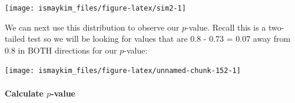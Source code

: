 \documentclass[]{tufte-book}
\newenvironment{Shaded}{\begin{snugshade}}{\end{snugshade}}
\newcommand{\KeywordTok}[1]{\textcolor[rgb]{0.13,0.29,0.53}{\textbf{{#1}}}}
\newcommand{\DataTypeTok}[1]{\textcolor[rgb]{0.13,0.29,0.53}{{#1}}}
\newcommand{\DecValTok}[1]{\textcolor[rgb]{0.00,0.00,0.81}{{#1}}}
\newcommand{\FloatTok}[1]{\textcolor[rgb]{0.00,0.00,0.81}{{#1}}}
\newcommand{\StringTok}[1]{\textcolor[rgb]{0.31,0.60,0.02}{{#1}}}
\newcommand{\NormalTok}[1]{{#1}}
\theoremstyle{definition}
\theoremstyle{definition}
\theoremstyle{remark}
\begin{document}
\begin{Shaded}
\end{Shaded}

\begin{center}\texttt{[image: ismaykim\_files/figure-latex/sim2-1]} \end{center}

We can next use this distribution to observe our \(p\)-value. Recall
this is a two-tailed test so we will be looking for values that are 0.8
- 0.73 = 0.07 away from 0.8 in BOTH directions for our \(p\)-value:

\begin{Shaded}
\end{Shaded}

\begin{center}\texttt{[image: ismaykim\_files/figure-latex/unnamed-chunk-152-1]} \end{center}

\paragraph{\texorpdfstring{Calculate
\(p\)-value}{Calculate p-value}}\label{calculate-p-value-1}
\end{document}
